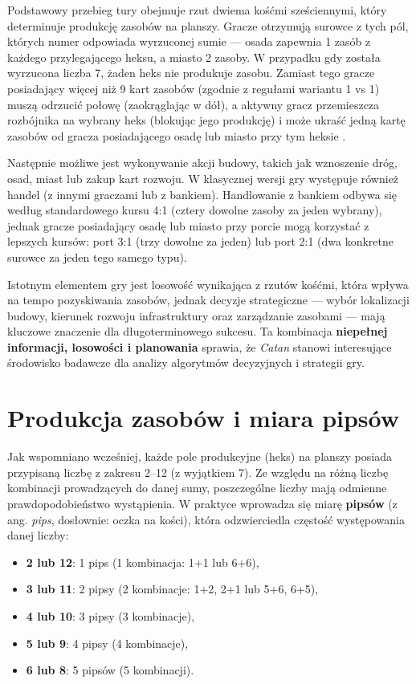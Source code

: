 \documentclass[polish,inz,longabstract]{iithesis}
\begin{document}
Podstawowy przebieg tury obejmuje rzut dwiema kośćmi sześciennymi, który determinuje produkcję zasobów na planszy. Gracze otrzymują surowce z tych pól, których numer odpowiada wyrzuconej sumie — osada zapewnia 1 zasób z każdego przylegającego heksu, a miasto 2 zasoby. W przypadku gdy została wyrzucona liczba 7, żaden heks nie produkuje zasobu. Zamiast tego gracze posiadający więcej niż 9 kart zasobów (zgodnie z regułami wariantu 1 vs 1) muszą odrzucić połowę (zaokrąglając w dół), a aktywny gracz przemieszcza rozbójnika na wybrany heks (blokując jego produkcję) i może ukraść jedną kartę zasobów od gracza posiadającego osadę lub miasto przy tym heksie \cite{7}.

Następnie możliwe jest wykonywanie akcji budowy, takich jak wznoszenie dróg, osad, miast lub zakup kart rozwoju. W klasycznej wersji gry występuje również handel (z innymi graczami lub z bankiem). Handlowanie z bankiem odbywa się według standardowego kursu 4:1 (cztery dowolne zasoby za jeden wybrany), jednak gracze posiadający osadę lub miasto przy porcie mogą korzystać z lepszych kursów: port 3:1 (trzy dowolne za jeden) lub port 2:1 (dwa konkretne surowce za jeden tego samego typu).

Istotnym elementem gry jest losowość wynikająca z rzutów kośćmi, która wpływa na tempo pozyskiwania zasobów, jednak decyzje strategiczne — wybór lokalizacji budowy, kierunek rozwoju infrastruktury oraz zarządzanie zasobami — mają kluczowe znaczenie dla długoterminowego sukcesu. Ta kombinacja \textbf{niepełnej informacji, losowości i planowania} sprawia, że \textit{Catan} stanowi interesujące środowisko badawcze dla analizy algorytmów decyzyjnych i strategii gry.

\section{Produkcja zasobów i miara pipsów}

Jak wspomniano wcześniej, każde pole produkcyjne (heks) na planszy posiada przypisaną liczbę z zakresu 2–12 (z wyjątkiem 7). Ze względu na różną liczbę kombinacji prowadzących do danej sumy, poszczególne liczby mają odmienne prawdopodobieństwo wystąpienia. W praktyce wprowadza się miarę \textbf{pipsów} (z ang. \textit{pips}, dosłownie: oczka na kości), która odzwierciedla częstość występowania danej liczby:

\begin{itemize}
\item \textbf{2 lub 12}: 1 pips (1 kombinacja: 1+1 lub 6+6),
\item \textbf{3 lub 11}: 2 pipsy (2 kombinacje: 1+2, 2+1 lub 5+6, 6+5),
\item \textbf{4 lub 10}: 3 pipsy (3 kombinacje),
\item \textbf{5 lub 9}: 4 pipsy (4 kombinacje),
\item \textbf{6 lub 8}: 5 pipsów (5 kombinacji).
\end{itemize}
\end{document}
